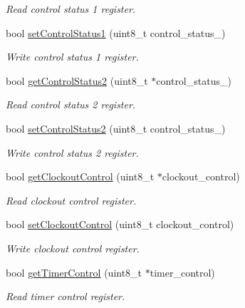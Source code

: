 \begin{DoxyCompactItemize}
\begin{DoxyCompactList}\small\item\em Read control status 1 register. \end{DoxyCompactList}\item 
bool \hyperlink{namespacePcf8563_a17680b8e68d064bb39007b4a6afc240e}{set\+Control\+Status1} (uint8\+\_\+t control\+\_\+status\+\_)
\begin{DoxyCompactList}\small\item\em Write control status 1 register. \end{DoxyCompactList}\item 
bool \hyperlink{namespacePcf8563_a6cf47400c4e974b9d9a1bf1d1a9e463d}{get\+Control\+Status2} (uint8\+\_\+t $\ast$control\+\_\+status\+\_)
\begin{DoxyCompactList}\small\item\em Read control status 2 register. \end{DoxyCompactList}\item 
bool \hyperlink{namespacePcf8563_ac23ff9ec298a4ec5a777139d972b5e4b}{set\+Control\+Status2} (uint8\+\_\+t control\+\_\+status\+\_)
\begin{DoxyCompactList}\small\item\em Write control status 2 register. \end{DoxyCompactList}\item 
bool \hyperlink{namespacePcf8563_aa6afef0bd9005fc8b8332c7cb82ec6ce}{get\+Clockout\+Control} (uint8\+\_\+t $\ast$clockout\+\_\+control)
\begin{DoxyCompactList}\small\item\em Read clockout control register. \end{DoxyCompactList}\item 
bool \hyperlink{namespacePcf8563_a52b2a6f5b28f961e7e4bece212c7bdd6}{set\+Clockout\+Control} (uint8\+\_\+t clockout\+\_\+control)
\begin{DoxyCompactList}\small\item\em Write clockout control register. \end{DoxyCompactList}\item 
bool \hyperlink{namespacePcf8563_a0aad62263917a9ceec3c12c88a29b835}{get\+Timer\+Control} (uint8\+\_\+t $\ast$timer\+\_\+control)
\begin{DoxyCompactList}\small\item\em Read timer control register. \end{DoxyCompactList}\item 

\end{DoxyCompactItemize}
